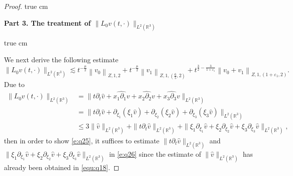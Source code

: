 \documentclass[10pt,a4paper]{amsart}
\newcommand{\R}{\mathbb R}
\newcommand{\f}{\frac}
\newcommand{\p}{\partial}
\begin{document}
\begin{proof}
 true cm

{\bf Part 3.  The treatment  of $\|L_0v(t, \cdot)\|_{L^2(\R^3)}$ }

 true cm

We next derive the following estimate
\begin{equation}\label{e:q25}
\|L_0v(t, \cdot)\|_{L^2(\R^3)} \lesssim t^{-\f{\mu}{2}}\left\|v_0\right\|_{Z, 1, 2}+t^{-\f{\mu}{2}}\left\|v_1\right\|_{Z, 1,(\f65, 2)}+t^{\f32-\f{3}{1+\varepsilon_1}}\left\|v_0+v_1\right\|_{Z, 1,(1+\varepsilon_1, 2)}.
\end{equation}
Due to
\begin{equation}\label{e:q26}
\begin{aligned}
\|L_0v(t, \cdot)\|_{L^2(\R^3)}& =\|t\p_t\hat{v}+\widehat{x_1\p_1v}+\widehat{x_2\p_2v}+\widehat{x_3\p_3v}\|_{L^2(\R^3)}\\
& =\|t\p_t\hat{v}+\p_{\xi_1}(\xi_1\hat{v})+\p_{\xi_2}(\xi_2\hat{v})+\p_{\xi_3}(\xi_3\hat{v})\|_{L^2(\R^3)}\\
&\leq 3\|\hat{v}\|_{L^2(\R^3)}+\|t\p_t\hat{v}\|_{L^2(\R^3)}+\|\xi_1\p_{\xi_1}\hat{v}+\xi_2\p_{\xi_2}\hat{v}+\xi_3\p_{\xi_3}\hat{v}\|_{L^2(\R^3)},
\end{aligned}
\end{equation}
then in order to show \eqref{e:q25}, it suffices to estimate $\|t\p_t\hat{v}\|_{L^2(\R^3)}$ and $\|\xi_1\p_{\xi_1}\hat{v}+\xi_2\p_{\xi_2}\hat{v}+\xi_3\p_{\xi_3}\hat{v}\|_{L^2(\R^3)}$ in \eqref{e:q26} since the estimate of $\|\hat{v}\|_{L^2(\R^3)}$ has already been obtained in \eqref{equ:q18}.


\end{proof}
\end{document}
